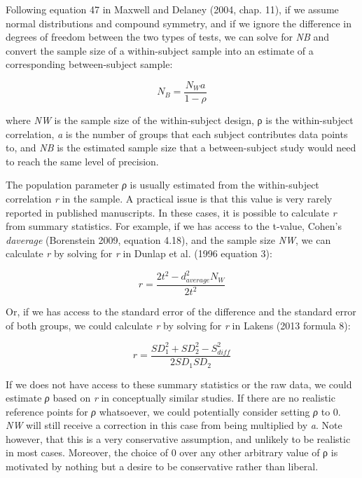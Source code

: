 \documentclass[]{article}
\begin{document}
Following equation 47 in Maxwell and Delaney (2004, chap. 11), if we
assume normal distributions and compound symmetry, and if we ignore the
difference in degrees of freedom between the two types of tests, we can
solve for \emph{NB} and convert the sample size of a within-subject
sample into an estimate of a corresponding between-subject sample:

\[
\begin{equation}
N_B=\frac{N_Wa}{1-ρ}
\label{eq:convertwithin}
\tag{9}
\end{equation}
\]

where \emph{NW} is the sample size of the within-subject design, ρ is
the within-subject correlation, \emph{a} is the number of groups that
each subject contributes data points to, and \emph{NB} is the estimated
sample size that a between-subject study would need to reach the same
level of precision.

The population parameter \emph{ρ} is usually estimated from the
within-subject correlation \emph{r} in the sample. A practical issue is
that this value is very rarely reported in published manuscripts. In
these cases, it is possible to calculate \emph{r} from summary
statistics. For example, if we has access to the t-value, Cohen's
\emph{daverage} (Borenstein 2009, equation 4.18), and the sample size
\emph{NW}, we can calculate \emph{r} by solving for \emph{r} in Dunlap
et al. (1996 equation 3):

\[
\begin{equation}
r=\frac{2t^2-d_{average}^2N_W}{2t^2}
\label{eq:rfromtval}
\tag{10}
\end{equation}
\]

Or, if we has access to the standard error of the difference and the
standard error of both groups, we could calculate \emph{r} by solving
for \emph{r} in Lakens (2013 formula 8):

\[
\begin{equation}
r=\frac{SD_1^2+SD_2^2-S_{diff}^2}{2SD_1SD_2}
\label{eq:rfromSDs}
\tag{11}
\end{equation}
\]

If we does not have access to these summary statistics or the raw data,
we could estimate \emph{ρ} based on \emph{r} in conceptually similar
studies. If there are no realistic reference points for \emph{ρ}
whatsoever, we could potentially consider setting \emph{ρ} to 0.
\emph{NW} will still receive a correction in this case from being
multiplied by \emph{a}. Note however, that this is a very conservative
assumption, and unlikely to be realistic in most cases. Moreover, the
choice of 0 over any other arbitrary value of ρ is motivated by nothing
but a desire to be conservative rather than liberal.
\end{document}
